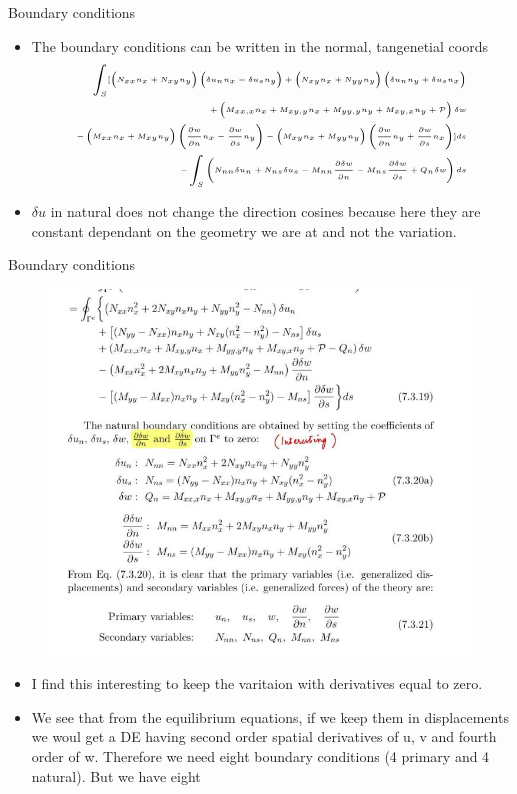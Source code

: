	\begin{frame}{Boundary conditions}
		\begin{itemize}
			\item The boundary conditions can be written in the normal, tangenetial coords 
			\begin{equation}
			\tiny
			\begin{aligned}
			\int_S [ 
			\left(N_{xx}n_x + N_{xy}n_y\right)\left(\delta u_nn_x - \delta u_sn_y\right) +
			\left(N_{xy}n_x + N_{yy}n_y\right)\left(\delta u_nn_y + \delta u_sn_x\right) \\ +
			\left( M_{xx,x}n_x + M_{xy,y}n_x + M_{yy,y}n_y + M_{xy,x}n_y + \mathcal{P} \right) \delta w \\ - 
			\left(M_{xx}n_x + M_{xy}n_y \right)\left(\frac{\partial w}{\partial n} n_x 
			- \frac{\partial w}{\partial s}n_y \right) - 
			\left(M_{xy}n_x + M_{yy}n_y \right)\left(\frac{\partial w}{\partial n} n_y 
			+ \frac{\partial w}{\partial s}n_x \right)]ds\\
			 - \int_S \left(N_{nn} \delta u_n + N_{ns}\delta u_s - M_{nn}\frac{\partial \delta w}{\partial n} - M_{ns}\frac{\partial \delta w}{\partial s} + Q_n \delta w \right)ds
			\end{aligned} 
			\end{equation}
			\item $\delta u$ in natural does not change the direction cosines because here they are constant dependant on the geometry we are at and not the variation.
		\end{itemize}
	\end{frame}


	\begin{frame}{Boundary conditions}
		\begin{figure}
			\centering
			\includegraphics[width=0.7\linewidth]{Figure/fig36} 		
		\end{figure}
		\begin{itemize}
			\tiny
			\item I find this interesting to keep the varitaion with derivatives equal to zero.
			\item We see that from the equilibrium equations, if we keep them in displacements we woul get a DE having second order spatial derivatives of u, v and fourth order of w. Therefore we need eight boundary conditions (4 primary and 4 natural). But we have eight
		\end{itemize}
	\end{frame}


